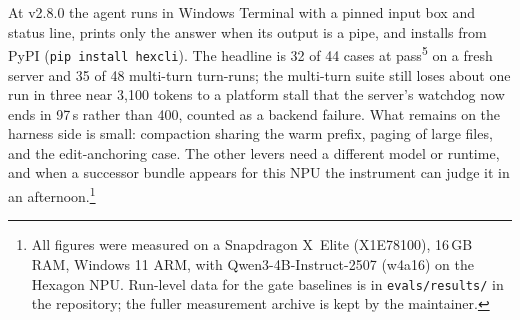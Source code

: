 \documentclass[11pt]{article}
\newcommand{\code}[1]{\texttt{\small #1}}
\begin{document}
At v2.8.0 the agent runs in Windows Terminal with a pinned input box and
status line, prints only the answer when its output is a pipe, and installs
from PyPI (\code{pip install hexcli}). The headline is 32 of 44 cases at
pass\textsuperscript{5} on a fresh server and 35 of 48 multi-turn turn-runs;
the multi-turn suite still loses about one run in three near 3{,}100 tokens
to a platform stall that the server's watchdog now ends in 97\,s rather than
400, counted as a backend failure. What remains on the harness side is small:
compaction sharing the warm prefix, paging of large files, and the
edit-anchoring case. The other levers need a different model or runtime,
and when a successor bundle appears for this NPU the instrument can judge it
in an afternoon.\footnote{All figures were measured on a Snapdragon X~Elite
(X1E78100), 16\,GB RAM, Windows 11 ARM, with Qwen3-4B-Instruct-2507 (w4a16)
on the Hexagon NPU. Run-level data for the gate baselines is in \code{evals/results/} in
the repository; the fuller measurement archive is kept by the maintainer.}
\end{document}
